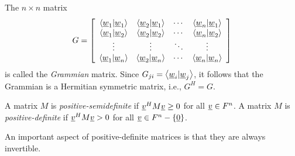 \begin{definition}
The $n \times n$ matrix
\begin{equation} \label{equation:GrammianMatrix}
G = \left[ \begin{array}{cccc}
\left\langle \underline{w}_1 | \underline{w}_1 \right\rangle
& \left\langle \underline{w}_2 | \underline{w}_1 \right\rangle & \cdots
& \left\langle \underline{w}_n | \underline{w}_1 \right\rangle \\
\left\langle \underline{w}_1 | \underline{w}_2 \right\rangle
& \left\langle \underline{w}_2 | \underline{w}_2 \right\rangle & \cdots
& \left\langle \underline{w}_n | \underline{w}_2 \right\rangle \\
\vdots & \vdots & \ddots & \vdots \\
\left\langle \underline{w}_1 | \underline{w}_n \right\rangle
& \left\langle \underline{w}_2 | \underline{w}_n \right\rangle & \cdots
& \left\langle \underline{w}_n | \underline{w}_n \right\rangle
\end{array} \right]
\end{equation}
is called the \emph{Grammian} matrix.
Since $G_{ji} = \left\langle \underline{w}_i | \underline{w}_j \right\rangle$, it follows that the Grammian is a Hermitian symmetric matrix, i.e., $G^H = G$.
\end{definition}

\begin{definition}
A matrix $M$ is \emph{positive-semidefinite} if $\underline{v}^H M \underline{v} \geq 0$ for all $\underline{v} \in F^n$.
A matrix $M$ is \emph{positive-definite} if $\underline{v}^H M \underline{v} > 0$ for all $\underline{v} \in F^n - \left\{ \underline{0} \right\}$.
\end{definition}

An important aspect of positive-definite matrices is that they are always invertible.

